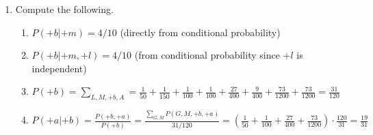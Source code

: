 \documentclass[12pt]{article}
\begin{document}
\begin{enumerate}
\begin{align*}
\intertext{The work for the first one is provided, while the others are left out. This is because the work is similar using Bayes' Nets.}
P(L,M,B,A) &= P(L|B,A,M)P(B|A,M)P(A|M)P(M)
\intertext{Where we can reduce this to the dependent variables, giving}
P(+l, +m, +b, +a) &= P(+l|+m)P(+b|+m)P(+a|+m)P(+m)
\intertext{Which is possible as the given conditional probabilities are only dependent upon $M$, and no the other conditions. Plugging in the values gives}
P(+l, +m, +b, +a) &= \left( \frac{8}{35} \right) \cdot \left( \frac{4}{10} \right) \cdot \left( \frac{3}{4} \right) \cdot \left( \frac{7}{24} \right) = \frac{1}{50}
\end{align*}

\item Compute the following.

      \begin{enumerate}

      \item $P(+b | +m) = 4/10$ (directly from conditional probability)

      \item $P(+b | +m, +l) = 4/10$ (from conditional probability since $+l$ is independent)

      \item $P(+b) = \sum_{L,M,+b,A} = \frac{1}{50} + \frac{1}{150} + \frac{1}{100} + \frac{1}{100} + \frac{27}{400} + \frac{9}{400} + \frac{73}{1200} + \frac{73}{1200} = \frac{31}{120}$

      \item $P(+a | +b) = \frac{P(+b,+a)}{P(+b)} = \frac{\sum_{G,M} P(G,M,+b,+a)}{31/120} = \left( \frac{1}{50} + \frac{1}{100} + \frac{27}{400} + \frac{73}{1200}\right) \cdot \frac{120}{31} = \frac{19}{31}$

      \end{enumerate}

\end{enumerate}
\end{document}
